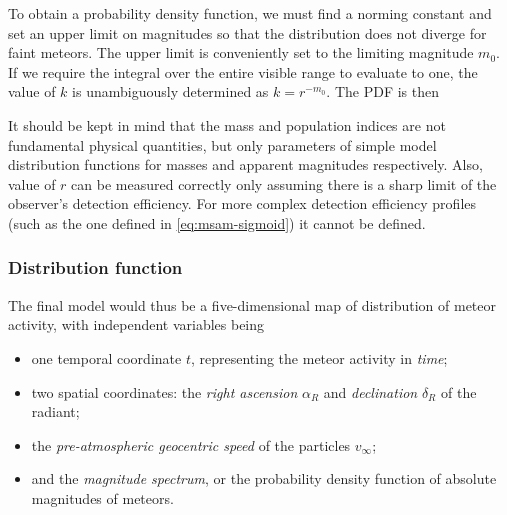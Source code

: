             To obtain a probability density function, we must find a norming constant
            and set an upper limit on magnitudes so that the distribution does not diverge for faint meteors.
            The upper limit is conveniently set to the limiting magnitude $m_0$.
            If we require the integral over the entire visible range to evaluate to one,
            the value of $k$ is unambiguously determined as $k = r^{-m_0}$.
            The PDF is then

            It should be kept in mind that the mass and population indices are not fundamental physical quantities,
            but only parameters of simple model distribution functions for masses and apparent magnitudes respectively.
            Also, value of $r$ can be measured correctly only assuming there is a sharp limit of the observer's detection efficiency.
            For more complex detection efficiency profiles (such as the one defined in \cref{eq:msam-sigmoid})
            it cannot be defined.

        \subsubsection{Distribution function} \label{mspd}
            The final model would thus be a five-dimensional map of distribution of meteor activity, with independent variables being
            \begin{itemize}
                \item one temporal coordinate $t$, representing the meteor activity in \emph{time};
                \item two spatial coordinates: the \emph{right ascension} $\alpha_R$ and \emph{declination} $\delta_R$ of the radiant;
                \item the \emph{pre-atmospheric geocentric speed} of the particles $v_\infty$;
                \item and the \emph{magnitude spectrum}, or the probability density function of absolute magnitudes of meteors.
            \end{itemize}

